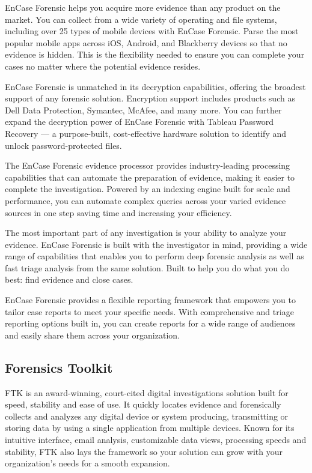 EnCase Forensic helps you acquire more evidence than any product on the market. You can collect from a wide variety of operating and file systems, including over 25 types of mobile devices with EnCase Forensic. Parse the most popular mobile apps across iOS, Android, and Blackberry devices so that no evidence is hidden. This is the flexibility needed to ensure you can complete your cases no matter where the potential evidence resides.

EnCase Forensic is unmatched in its decryption capabilities, offering the broadest support of any forensic solution. Encryption support includes products such as Dell Data Protection, Symantec, McAfee, and many more. You can further expand the decryption power of EnCase Forensic with Tableau Password Recovery — a purpose-built, cost-effective hardware solution to identify and unlock password-protected files. 

The EnCase Forensic evidence processor provides industry-leading processing capabilities that can automate the preparation of evidence, making it easier to complete the investigation. Powered by an indexing engine built for scale and performance, you can automate complex queries across your varied evidence sources in one step saving time and increasing your efficiency. 

The most important part of any investigation is your ability to analyze your evidence. EnCase Forensic is built with the investigator in mind, providing a wide range of capabilities that enables you to perform deep forensic analysis as well as fast triage analysis from the same solution. Built to help you do what you do best: find evidence and close cases. 

EnCase Forensic provides a flexible reporting framework that empowers you to tailor case reports to meet your specific needs. With comprehensive and triage reporting options built in, you can create reports for a wide range of audiences and easily share them across your organization. 

\subsection{Forensics Toolkit}

FTK is an award-winning, court-cited digital investigations solution built for speed, stability and ease of use. It quickly 
locates evidence and forensically collects and analyzes any digital device or system producing, transmitting or 
storing data by using a single application from multiple devices. Known for its intuitive interface, email analysis, 
customizable data views, processing speeds and stability, FTK also lays the framework so your solution can grow 
with your organization’s needs for a smooth expansion. 

